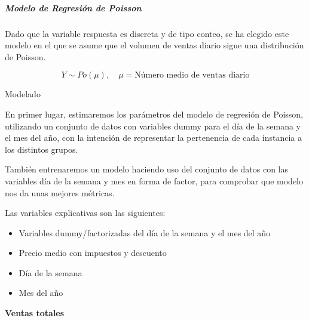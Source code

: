 \documentclass[
]{article}
\author{}
\date{\vspace{-2.5em}}
\providecommand{\tightlist}{%
  \setlength{\itemsep}{0pt}\setlength{\parskip}{0pt}}
\begin{document}
\ifdefined\ifprincipal
\else
\setlength{\parindent}{1em}
\pagestyle{fancy}
\setcounter{tocdepth}{4}
\tableofcontents

\fi

\ifdefined\ifdoblecara
\fancyhead{}{}
\fancyhead[LE,RO]{\scriptsize\rightmark}
\fancyfoot[LO,RE]{\scriptsize\slshape \leftmark}
\fancyfoot[C]{}
\fancyfoot[LE,RO]{\footnotesize\thepage}
\else
\fancyhead{}{}
\fancyhead[RO]{\scriptsize\rightmark}
\fancyfoot[LO]{\scriptsize\slshape \leftmark}
\fancyfoot[C]{}
\fancyfoot[RO]{\footnotesize\thepage}
\fi
\renewcommand{\headrulewidth}{0.4pt}
\renewcommand{\footrulewidth}{0.4pt}

\hypertarget{modelo-de-regresiuxf3n-de-poisson}{%
\subparagraph{Modelo de Regresión de
Poisson}\label{modelo-de-regresiuxf3n-de-poisson}}

Dado que la variable respuesta es discreta y de tipo conteo, se ha
elegido este modelo en el que se asume que el volumen de ventas diario
sigue una distribución de Poisson.

\[Y \sim Po(\mu), \quad \mu=\text{Número medio de ventas diario}\]

Modelado

En primer lugar, estimaremos los parámetros del modelo de regresión de
Poisson, utilizando un conjunto de datos con variables dummy para el día
de la semana y el mes del año, con la intención de representar la
pertenencia de cada instancia a los distintos grupos.

También entrenaremos un modelo haciendo uso del conjunto de datos con
las variables día de la semana y mes en forma de factor, para comprobar
que modelo nos da unas mejores métricas.

Las variables explicativas son las siguientes:

\begin{itemize}
\tightlist
\item
  Variables dummy/factorizadas del día de la semana y el mes del año
\item
  Precio medio con impuestos y descuento
\item
  Día de la semana
\item
  Mes del año
\end{itemize}

\textbf{Ventas totales}
\end{document}
